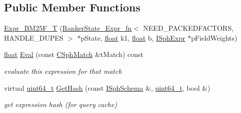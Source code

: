 \subsection*{Public Member Functions}
\begin{DoxyCompactItemize}
\item 
\hyperlink{structExpr__BM25F__T_a02f1e34868d04a01653a7c9bcf6eb3f7}{Expr\-\_\-\-B\-M25\-F\-\_\-\-T} (\hyperlink{structRankerState__Expr__fn}{Ranker\-State\-\_\-\-Expr\-\_\-fn}$<$ N\-E\-E\-D\-\_\-\-P\-A\-C\-K\-E\-D\-F\-A\-C\-T\-O\-R\-S, H\-A\-N\-D\-L\-E\-\_\-\-D\-U\-P\-E\-S $>$ $\ast$p\-State, \hyperlink{sphinxexpr_8cpp_a0e0d0739f7035f18f949c2db2c6759ec}{float} k1, \hyperlink{sphinxexpr_8cpp_a0e0d0739f7035f18f949c2db2c6759ec}{float} b, \hyperlink{structISphExpr}{I\-Sph\-Expr} $\ast$p\-Field\-Weights)
\item 
\hyperlink{sphinxexpr_8cpp_a0e0d0739f7035f18f949c2db2c6759ec}{float} \hyperlink{structExpr__BM25F__T_a7e57d0218d02e1f03aeefb28eb6300cb}{Eval} (const \hyperlink{classCSphMatch}{C\-Sph\-Match} \&t\-Match) const 
\begin{DoxyCompactList}\small\item\em evaluate this expression for that match \end{DoxyCompactList}\item 
virtual \hyperlink{sphinxstd_8h_aaa5d1cd013383c889537491c3cfd9aad}{uint64\-\_\-t} \hyperlink{structExpr__BM25F__T_aa6c7b66ae29dde989fb562784e1e639a}{Get\-Hash} (const \hyperlink{classISphSchema}{I\-Sph\-Schema} \&, \hyperlink{sphinxstd_8h_aaa5d1cd013383c889537491c3cfd9aad}{uint64\-\_\-t}, bool \&)
\begin{DoxyCompactList}\small\item\em get expression hash (for query cache) \end{DoxyCompactList}\end{DoxyCompactItemize}
